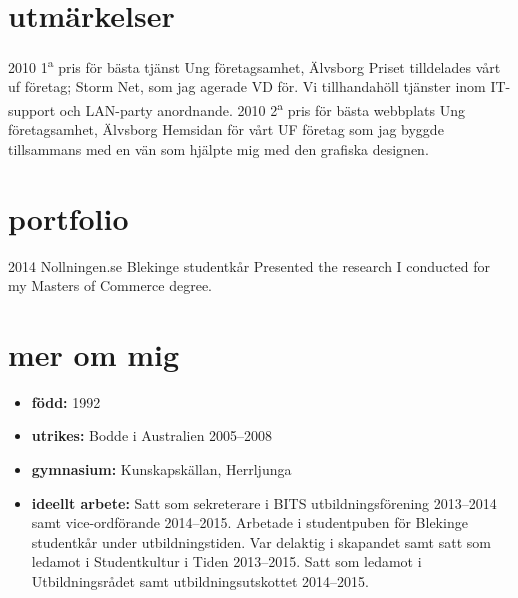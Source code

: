 \documentclass[]{friggeri-cv} %
\begin{document}

\section{utmärkelser}

\begin{entrylist}
\entry
{2010}
{1\textsuperscript{a} pris för bästa tjänst}
{Ung företagsamhet, Älvsborg}
{Priset tilldelades vårt uf företag; Storm Net, som jag agerade VD för. Vi tillhandahöll tjänster inom IT-support och LAN-party anordnande.}
\entry
{2010}
{2\textsuperscript{a} pris för bästa webbplats}
{Ung företagsamhet, Älvsborg}
{Hemsidan för vårt UF företag som jag byggde tillsammans med en vän som hjälpte mig med den grafiska designen.}
\end{entrylist}

\newpage
\section{portfolio}

\begin{entrylist}
\entry
{2014}
{Nollningen.se}
{Blekinge studentkår}
{Presented the research I conducted for my Masters of Commerce degree.}
\end{entrylist}


\section{mer om mig}
\begin{itemize}
	\item \textbf{född:} 1992
	\item \textbf{utrikes:} Bodde i Australien 2005--2008
	\item \textbf{gymnasium:} Kunskapskällan, Herrljunga
	\item \textbf{ideellt arbete:} Satt som sekreterare i BITS utbildningsförening 2013--2014 samt vice-ordförande 2014--2015. Arbetade i studentpuben för Blekinge studentkår under utbildningstiden. Var delaktig i skapandet samt satt som ledamot i Studentkultur i Tiden 2013--2015. Satt som ledamot i Utbildningsrådet samt utbildningsutskottet 2014--2015.
\end{itemize}
\end{document}
